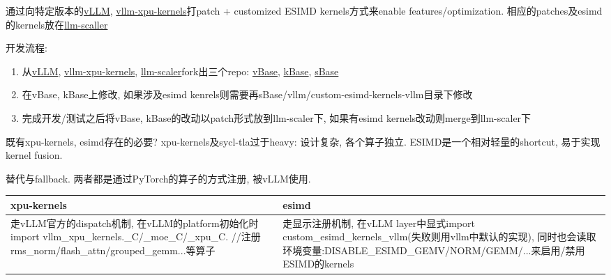 通过向特定版本的\href{https://github.com/intel-innersource/applications.ai.gpu.vllm-xpu}{vLLM}, \href{https://github.com/vllm-project/vllm-xpu-kernels}{vllm-xpu-kernels}打patch + customized ESIMD kernels方式来enable features/optimization. 
相应的patches及esimd的kernels放在\href{https://github.com/intel/llm-scaler/}{llm-scaller}

开发流程:
\begin{enumerate}
    \item 从\href{https://github.com/intel-innersource/applications.ai.gpu.vllm-xpu}{vLLM}, \href{https://github.com/vllm-project/vllm-xpu-kernels}{vllm-xpu-kernels}, \href{https://github.com/intel/llm-scaler/}{llm-scaler}fork出三个repo: \href{https://github.com/intel-sandbox/llm-scaler-vllm-xpu}{vBase}, 
	\href{https://github.com/analytics-zoo/vllm-xpu-kernels}{kBase}, \href{https://github.com/intel/llm-scaler/}{sBase}
    \item 在vBase, kBase上修改, 如果涉及esimd kenrels则需要再sBase/vllm/custom-esimd-kernels-vllm目录下修改
    \item 完成开发/测试之后将vBase, kBase的改动以patch形式放到llm-scaler下, 如果有esimd kernels改动则merge到llm-scaler下
\end{enumerate}


既有xpu-kernels, esimd存在的必要?  xpu-kernels及sycl-tla过于heavy: 设计复杂, 各个算子独立. ESIMD是一个相对轻量的shortcut, 易于实现kernel fusion.

替代与fallback. 两者都是通过PyTorch的算子的方式注册, 被vLLM使用.
\begin{longtable}{p{9cm}|p{9cm}}
xpu-kernels&esimd\\
\hline
走vLLM官方的dispatch机制, 在vLLM的platform初始化时import vllm\_xpu\_kernels.\_C/\_moe\_C/\_xpu\_C. //注册rms\_norm/flash\_attn/grouped\_gemm...等算子
&
走显示注册机制, 在vLLM layer中显式import custom\_esimd\_kernels\_vllm(失败则用vllm中默认的实现), 同时也会读取环境变量:DISABLE\_ESIMD\_{GEMV/NORM/GEMM/...}来启用/禁用ESIMD的kernels\\
\end{longtable}


